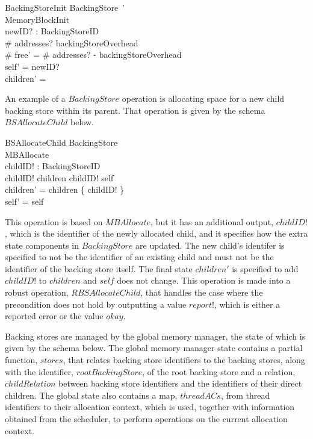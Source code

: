 \documentclass[a4paper,10pt]{report}
\begin{document}
\begin{schema}{BackingStoreInit}
  BackingStore~' \\
  MemoryBlockInit \\
  newID? : BackingStoreID \\
\where
  \# addresses? \geq backingStoreOverhead \\
  \# free' = \# addresses? - backingStoreOverhead \\
  self' = newID? \\
  children' = \emptyset \\
\end{schema}
%
An example of a $BackingStore$ operation is allocating space for a new child
backing store within its parent. That operation is given by the schema
$BSAllocateChild$ below.
%
\begin{schema}{BSAllocateChild}
  \Delta BackingStore \\
  MBAllocate \\
  childID! : BackingStoreID \\
  \where
  childID! \notin children \land childID! \neq self \\
  children' = children \cup \{ childID! \} \\
  self' = self
\end{schema}
%
This operation is based on $MBAllocate$, but it has an additional output,
$childID!$, which is the identifier of the newly allocated child, and it
specifies how the extra state components in $BackingStore$ are updated. The new
child's identifer is specified to not be the identifier of an existing child and
must not be the identifier of the backing store itself. The final state
$children'$ is specified to add $childID!$ to $children$ and $self$ does not
change. This operation is made into a robust operation, $RBSAllocateChild$, that
handles the case where the precondition does not hold by outputting a value
$report!$, which is either a reported error or the value $okay$.

Backing stores are managed by the global memory manager, the state of which is
given by the schema below. The global memory manager state contains a partial
function, $stores$, that relates backing store identifiers to the backing
stores, along with the identifier, $rootBackingStore$, of the root backing store
and a relation, $childRelation$ between backing store identifiers and the
identifiers of their direct children. The global state also contains a map,
$threadACs$, from thread identifiers to their allocation context, which is used,
together with information obtained from the scheduler, to perform operations on
the current allocation context.
\end{document}
